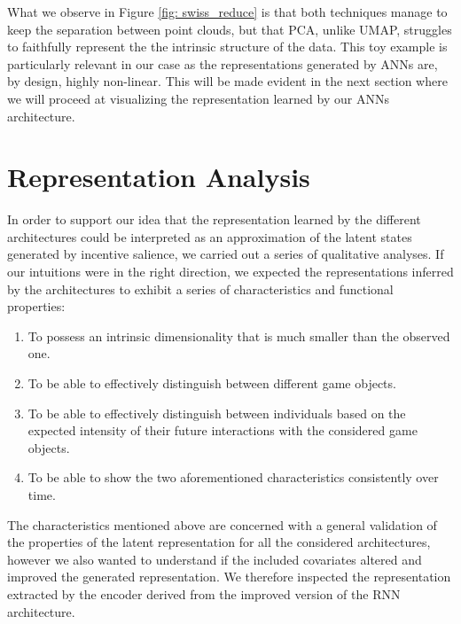 What we observe in Figure  \ref{fig: swiss_reduce} is that both techniques manage to keep the separation between point clouds, but that PCA, unlike  UMAP, struggles to faithfully represent the the intrinsic structure of the data. This toy example is particularly relevant in our case as the representations generated by ANNs are, by design, highly non-linear. This will be made evident in the next section where we will proceed at visualizing the representation learned by our ANNs architecture.

\section{Representation Analysis}
\label{representation_analysis}
In order to support our idea that the representation learned by the different architectures could be interpreted as an approximation of the latent states generated by incentive salience, we carried out a series of qualitative analyses. If our intuitions were in the right direction, we expected the representations inferred by the architectures to exhibit a series of characteristics and functional properties:
\begin{enumerate}
    \item To possess an intrinsic dimensionality that is much smaller than the observed one.
    \item To be able to effectively distinguish between different game objects.
    \item To be able to effectively distinguish between individuals based on the expected intensity of their future interactions with the considered game objects.
    \item To be able to show the two aforementioned characteristics consistently over time.
\end{enumerate}

The characteristics mentioned above are concerned with a general validation of the properties of the latent representation for all the considered architectures, however we also wanted to understand if the included covariates altered and improved the generated representation.  We therefore inspected the representation extracted by the encoder derived from the improved version of the RNN architecture. 

